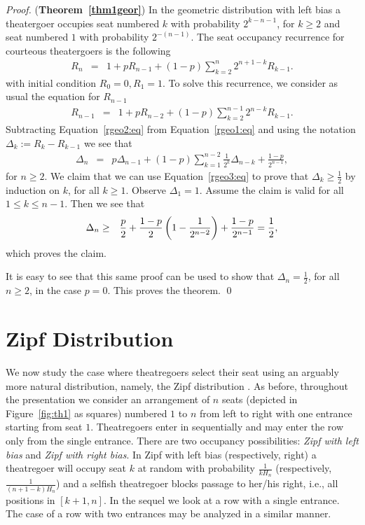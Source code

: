 \documentclass[11pt]{llncs}
\begin{document}
\begin{proof} ({\bf Theorem~\ref{thm1geor}})
In the geometric distribution with left bias a theatergoer
occupies seat numbered $k$ with probability
$2^{k-n-1}$, for $k \geq 2$ and seat numbered $1$
with probability $2^{-(n-1)}$.
The seat occupancy
recurrence for courteous theatergoers is the following
\begin{eqnarray}
R_n &=& \label{rgeo1:eq}
1 + p R_{n-1} + (1-p) \sum_{k=2}^{n} 2^{n+1-k}R_{k-1} .
\end{eqnarray}
with initial condition $R_0=0, R_1 = 1$.
To solve this recurrence, we
consider as usual the equation for $R_{n-1}$
\begin{eqnarray}
R_{n-1} &=& \label{rgeo2:eq}
1 + p R_{n-2} + (1-p) \sum_{k=2}^{n-1} 2^{n-k}R_{k-1} .
\end{eqnarray}
Subtracting Equation~\eqref{rgeo2:eq} from Equation~\eqref{rgeo1:eq}
and using the notation $\Delta_k := R_k - R_{k-1}$ we see that
\begin{eqnarray}
\Delta_n &=& \label{rgeo3:eq}
p \Delta_{n-1} + (1-p) \sum_{k=1}^{n-2} \frac{1}{2^k} \Delta_{n-k} + \frac{1-p}{2^{n-1}}, 
\end{eqnarray}
for $n \geq 2$. We claim that we
can use Equation~\eqref{rgeo3:eq} to prove that
$\Delta_k \geq \frac{1}{2}$ by induction on $k$, for all
$k \geq 1$. 
Observe $\Delta_1 = 1$.
Assume the claim is valid for all $1 \leq k \leq n-1$. Then we see that
\begin{eqnarray}
\Delta_n 
&\geq& \notag
\frac{p}{2} +
\frac{1-p}{2} \left( 1- \frac{1}{2^{n-2}} \right) + \frac{1-p}{2^{n-1}}
=
\frac{1}{2},
\end{eqnarray}
which proves the claim.

It is easy to see that this same proof can be used to
show that $\Delta_n=\frac1 2$, for all $n \geq 2$, in the
case $p=0$. This proves the theorem.
\qed
\end{proof}



\section{Zipf Distribution}
\label{zipf:sec}

We now study the case where theatregoers
select their seat 
using an arguably more natural  distribution, namely, the Zipf distribution \cite{zipf}.
As before, throughout the presentation we
consider an arrangement of $n$ seats 
(depicted in Figure~\ref{fig:th1} as squares) 
numbered $1$ to $n$ from left to right with
one entrance starting from seat $1$. 
Theatregoers enter in sequentially 
and may enter the row only from the single entrance.
There are two occupancy possibilities: {\em Zipf with left bias} and
{\em Zipf with right bias}.
In Zipf with left bias (respectively, right) a 
theatregoer will occupy 
seat $k$ at random with probability $\frac{1}{kH_n}$
(respectively, $\frac{1}{(n+1-k)H_n}$)
and a selfish theatregoer
blocks passage 
to her/his right, i.e., all positions in 
$[k+1,n]$. 
In the sequel we look at a row with a single
entrance. The case of a row with two entrances
may be analyzed in a similar manner.
\end{document}
